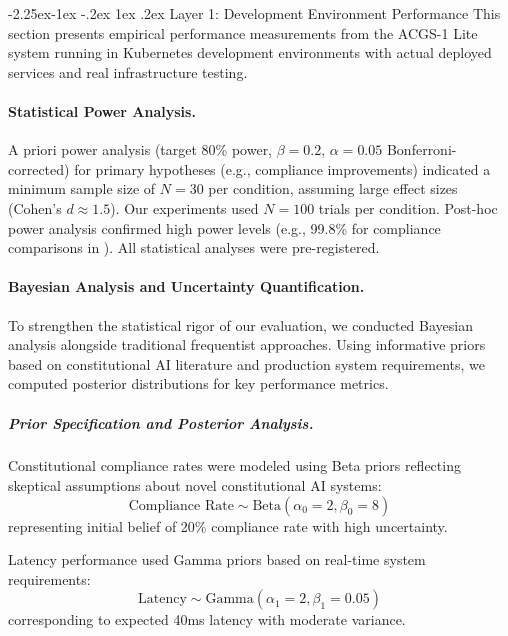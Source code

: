 \documentclass[manuscript,screen,9pt]{acmart}
\makeatletter
\renewcommand\subsection{\@startsection{subsection}{2}{\z@}%
  {-2.25ex\@plus -1ex \@minus -.2ex}%
  {1ex \@plus .2ex}%
  {\normalfont\large\bfseries}}
\makeatother
\begin{document}
\begin{table}[!htb]
\subsection{Layer 1: Development Environment Performance}
\label{subsec:development_performance}
This section presents empirical performance measurements from the ACGS-1 Lite system running in Kubernetes development environments with actual deployed services and real infrastructure testing.

\paragraph{Statistical Power Analysis.}
\label{subsec:power_analysis}
A priori power analysis (target 80\% power, $\beta = 0.2$, $\alpha = 0.05$ Bonferroni-corrected) for primary hypotheses (e.g., compliance improvements) indicated a minimum sample size of $N=30$ per condition, assuming large effect sizes (Cohen's $d \approx 1.5$). Our experiments used $N=100$ trials per condition. Post-hoc power analysis confirmed high power levels (e.g., 99.8\% for compliance comparisons in ). All statistical analyses were pre-registered.

\paragraph{Bayesian Analysis and Uncertainty Quantification.}
\label{subsec:bayesian_analysis}
To strengthen the statistical rigor of our evaluation, we conducted Bayesian analysis alongside traditional frequentist approaches. Using informative priors based on constitutional AI literature and production system requirements, we computed posterior distributions for key performance metrics.

\subparagraph{Prior Specification and Posterior Analysis.}
Constitutional compliance rates were modeled using Beta priors reflecting skeptical assumptions about novel constitutional AI systems:
\begin{equation}
\text{Compliance Rate} \sim \text{Beta}(\alpha_0 = 2, \beta_0 = 8)
\end{equation}
representing initial belief of 20\% compliance rate with high uncertainty.

Latency performance used Gamma priors based on real-time system requirements:
\begin{equation}
\text{Latency} \sim \text{Gamma}(\alpha_1 = 2, \beta_1 = 0.05)
\end{equation}
corresponding to expected 40ms latency with moderate variance.


\end{table}
\end{document}
